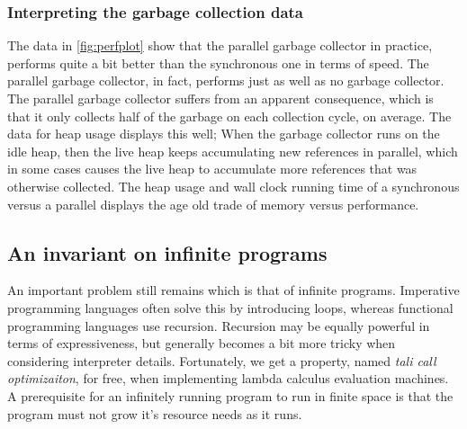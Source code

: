 \subsubsection{Interpreting the garbage collection data}
The data in \autoref{fig:perfplot} show that the parallel garbage collector in practice, performs quite a bit better than the synchronous one in terms of speed.
The parallel garbage collector, in fact, performs just as well as no garbage collector.
The parallel garbage collector suffers from an apparent consequence, which is that it only collects half of the garbage on each collection cycle, on average.
The data for heap usage displays this well; When the garbage collector runs on the idle heap, then the live heap keeps accumulating new references in parallel, which in some cases causes the live heap to accumulate more references that was otherwise collected.
The heap usage and wall clock running time of a synchronous versus a parallel displays the age old trade of memory versus performance.

\subsection{An invariant on infinite programs}\label{subsec:inf}
An important problem still remains which is that of infinite programs.
Imperative programming languages often solve this by introducing loops, whereas functional programming languages use recursion.
Recursion may be equally powerful in terms of expressiveness, but generally becomes a bit more tricky when considering interpreter details.
Fortunately, we get a property, named \textit{tali call optimizaiton}, for free, when implementing lambda calculus evaluation machines.
A prerequisite for an infinitely running program to run in finite space is that the program must not grow it's resource needs as it runs.

